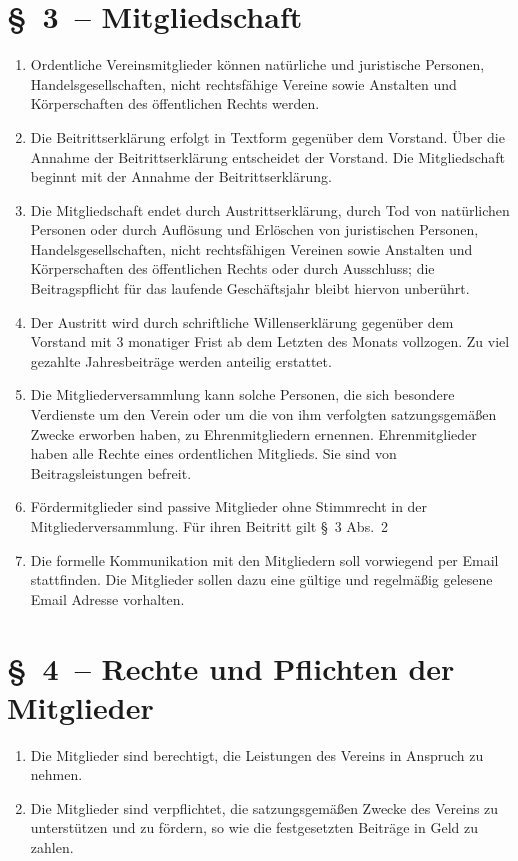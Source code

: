 \documentclass[11pt,DIV12]{scrartcl}
\begin{document}
\begin{enumerate}
\end{enumerate}

\section*{§~3~-- Mitgliedschaft}
\begin{enumerate}
\item Ordentliche Vereinsmitglieder können natürliche und juristische Personen, Handelsgesellschaften, nicht rechtsfähige Vereine sowie Anstalten und Körperschaften des öffentlichen Rechts werden.
\item Die Beitrittserklärung erfolgt in Textform gegenüber dem Vorstand. Über die Annahme der Beitrittserklärung entscheidet der Vorstand. Die Mitgliedschaft beginnt mit der Annahme der Beitrittserklärung.
\item Die Mitgliedschaft endet durch Austrittserklärung, durch Tod von natürlichen Personen oder durch Auflösung und Erlöschen von juristischen Personen, Handelsgesellschaften, nicht rechtsfähigen Vereinen sowie Anstalten und Körperschaften des öffentlichen Rechts oder durch Ausschluss; die Beitragspflicht für das laufende Geschäftsjahr bleibt hiervon unberührt.
\item Der Austritt wird durch schriftliche Willenserklärung gegenüber dem Vorstand mit 3 monatiger Frist ab dem Letzten des Monats vollzogen. Zu viel gezahlte Jahresbeiträge werden anteilig erstattet.
\item Die Mitgliederversammlung kann solche Personen, die sich besondere Verdienste um den Verein oder um die von ihm verfolgten satzungsgemäßen Zwecke erworben haben, zu Ehrenmitgliedern ernennen. Ehrenmitglieder haben alle Rechte eines ordentlichen Mitglieds. Sie sind von Beitragsleistungen befreit.
\item Fördermitglieder sind passive Mitglieder ohne Stimmrecht in der Mitgliederversammlung. Für ihren Beitritt gilt §~3 Abs.~2
\item Die formelle Kommunikation mit den Mitgliedern soll vorwiegend per Email stattfinden. Die Mitglieder sollen dazu eine gültige und regelmäßig gelesene Email Adresse vorhalten.
\end{enumerate}

\section*{§~4~-- Rechte und Pflichten der Mitglieder}
\begin{enumerate}
\item Die Mitglieder sind berechtigt, die Leistungen des Vereins in Anspruch zu nehmen.
\item Die Mitglieder sind verpflichtet, die satzungsgemäßen Zwecke des Vereins zu unterstützen und zu fördern, so wie die festgesetzten Beiträge in Geld zu zahlen.
\end{enumerate}
\end{document}
